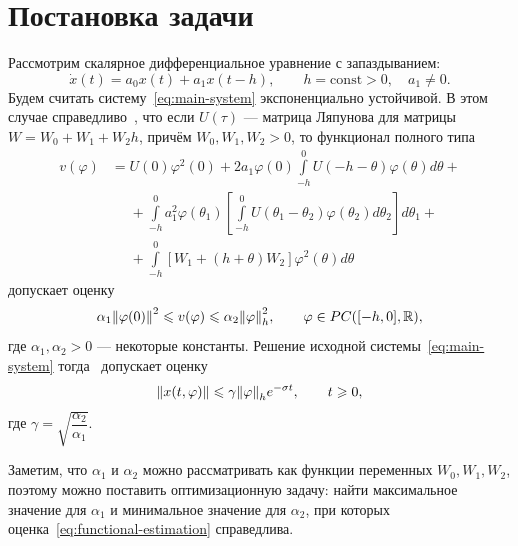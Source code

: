 \documentclass[a4paper,14pt]{article}
\theoremstyle{definition}
\begin{document}
\section{Постановка задачи}
Рассмотрим скалярное дифференциальное уравнение с запаздыванием:
\begin{equation}
  \label{eq:main-system}
  \dot x(t) = a_0 x(t) + a_1 x(t - h),
  \qquad h = \mathrm{const} > 0,
  \quad a_1 \neq 0.
\end{equation}
Будем считать систему~\eqref{eq:main-system} экспоненциально устойчивой.
В этом случае справедливо~\cite[стр.~66]{kharitonov2013}, что если
$U(\tau)$ --- матрица Ляпунова для матрицы $W = W_0 + W_1 + W_2 h$, причём
$W_0, W_1, W_2 > 0$, то функционал полного типа
\begin{equation}
  \label{eq:complete-type-functional}
  \begin{aligned}
    v(\varphi)
    &=
      U(0) \varphi^2(0)
      +
      2 a_1 \varphi(0) \int\limits_{-h}^{0} U(-h - \theta) \varphi(\theta) d\theta
      + \\
    &\phantom{=}
      +
      \int\limits_{-h}^{0} a_1^2 \varphi(\theta_1) \left[
      \int\limits_{-h}^{0} U(\theta_1 - \theta_2) \varphi(\theta_2) d\theta_2
      \right] d\theta_1
      + \\
    &\phantom{=}
      +
      \int\limits_{-h}^{0} \left[
      W_1 + (h + \theta) W_2
      \right] \varphi^2(\theta) d\theta
  \end{aligned}
\end{equation}
допускает оценку
\begin{equation}
  \label{eq:functional-estimation}
  \alpha_1 \norm{\varphi(0)}^2
  \leqslant
  v(\varphi)
  \leqslant
  \alpha_2 \norm{\varphi}_h^2,
  \qquad
  \varphi \in PC([-h, 0], \mathbb{R}),
\end{equation}
где $\alpha_1, \alpha_2 > 0$ --- некоторые константы. Решение исходной
системы~\eqref{eq:main-system} тогда~\cite[стр.~67]{kharitonov2013} допускает
оценку
\begin{equation*}
  \norm{x(t, \varphi)} \leqslant \gamma \norm{\varphi}_h e^{-\sigma t},
  \qquad t \geqslant 0,
\end{equation*}
где $\gamma = \sqrt{\dfrac{\alpha_2}{\alpha_1}}$.

Заметим, что $\alpha_1$ и $\alpha_2$ можно рассматривать как функции переменных
$W_0, W_1, W_2$, поэтому можно поставить оптимизационную задачу: найти
максимальное значение для $\alpha_1$ и минимальное значение для $\alpha_2$, при
которых оценка~\eqref{eq:functional-estimation} справедлива.
\end{document}
